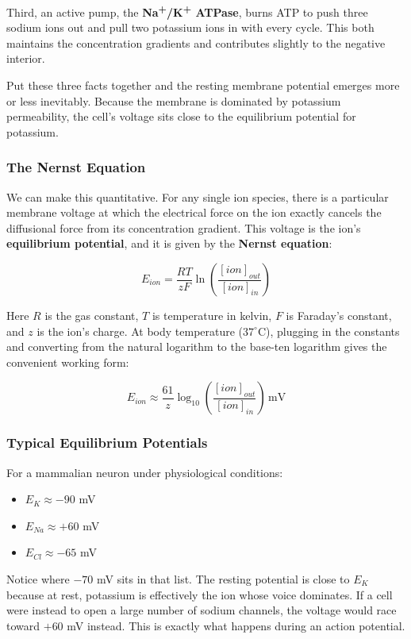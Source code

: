 \documentclass[11pt]{article}
\begin{document}
Third, an active pump, the \textbf{Na\textsuperscript{+}/K\textsuperscript{+} ATPase}, burns ATP to push three sodium ions out and pull two potassium ions in with every cycle. This both maintains the concentration gradients and contributes slightly to the negative interior.

Put these three facts together and the resting membrane potential emerges more or less inevitably. Because the membrane is dominated by potassium permeability, the cell's voltage sits close to the equilibrium potential for potassium.

\subsubsection{The Nernst Equation}

We can make this quantitative. For any single ion species, there is a particular membrane voltage at which the electrical force on the ion exactly cancels the diffusional force from its concentration gradient. This voltage is the ion's \textbf{equilibrium potential}, and it is given by the \textbf{Nernst equation}:

\[
E_{ion} = \frac{RT}{zF} \ln\!\left(\frac{[ion]_{out}}{[ion]_{in}}\right)
\]

Here $R$ is the gas constant, $T$ is temperature in kelvin, $F$ is Faraday's constant, and $z$ is the ion's charge. At body temperature ($37^\circ$C), plugging in the constants and converting from the natural logarithm to the base-ten logarithm gives the convenient working form:

\[
E_{ion} \approx \frac{61}{z} \log_{10}\!\left(\frac{[ion]_{out}}{[ion]_{in}}\right) \, \text{mV}
\]

\subsubsection{Typical Equilibrium Potentials}

For a mammalian neuron under physiological conditions:

\begin{itemize}
    \item $E_K \approx -90$ mV
    \item $E_{Na} \approx +60$ mV
    \item $E_{Cl} \approx -65$ mV
\end{itemize}

Notice where $-70$ mV sits in that list. The resting potential is close to $E_K$ because at rest, potassium is effectively the ion whose voice dominates. If a cell were instead to open a large number of sodium channels, the voltage would race toward $+60$ mV instead. This is exactly what happens during an action potential.
\end{document}
